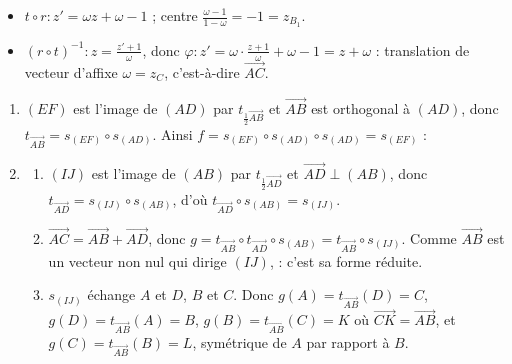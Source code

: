 \begin{corrige}
\begin{sol}
\begin{enumerate}
\begin{itemize}
                  \item $t \circ r : z' = \omega z + \omega - 1$ ; centre $\frac{\omega - 1}{1 - \omega} = -1 = z_{B_1}$.
                  \item $(r \circ t)^{-1} : z = \frac{z' + 1}{\omega}$, donc $\varphi : z' = \omega \cdot \frac{z+1}{\omega} + \omega - 1 = z + \omega$ :
                        translation de vecteur d'affixe $\omega = z_C$, c'est-à-dire $\overrightarrow{AC}$.
            \end{itemize}
\end{enumerate}
\end{sol}
\begin{sol}
\begin{enumerate}
      \item $(EF)$ est l'image de $(AD)$ par $t_{\frac12\overrightarrow{AB}}$ et $\overrightarrow{AB}$ est orthogonal à $(AD)$, donc
            $t_{\overrightarrow{AB}} = s_{(EF)} \circ s_{(AD)}$. Ainsi $f = s_{(EF)} \circ s_{(AD)} \circ s_{(AD)} = s_{(EF)}$ :
      \item \begin{enumerate}
                  \item $(IJ)$ est l'image de $(AB)$ par $t_{\frac12\overrightarrow{AD}}$ et $\overrightarrow{AD} \perp (AB)$, donc
                        $t_{\overrightarrow{AD}} = s_{(IJ)} \circ s_{(AB)}$, d'où $t_{\overrightarrow{AD}} \circ s_{(AB)} = s_{(IJ)}$.
                  \item $\overrightarrow{AC} = \overrightarrow{AB} + \overrightarrow{AD}$, donc
                        $g = t_{\overrightarrow{AB}} \circ t_{\overrightarrow{AD}} \circ s_{(AB)} = t_{\overrightarrow{AB}} \circ s_{(IJ)}$.
                        Comme $\overrightarrow{AB}$ est un vecteur non nul qui dirige $(IJ)$,
                         : c'est sa forme réduite.
                  \item $s_{(IJ)}$ échange $A$ et $D$, $B$ et $C$. Donc $g(A) = t_{\overrightarrow{AB}}(D) = C$, $g(D) = t_{\overrightarrow{AB}}(A) = B$,
                        $g(B) = t_{\overrightarrow{AB}}(C) = K$ où $\overrightarrow{CK} = \overrightarrow{AB}$, et $g(C) = t_{\overrightarrow{AB}}(B) = L$,
                        symétrique de $A$ par rapport à $B$.
            \end{enumerate}

\end{enumerate}
\end{sol}
\end{corrige}
